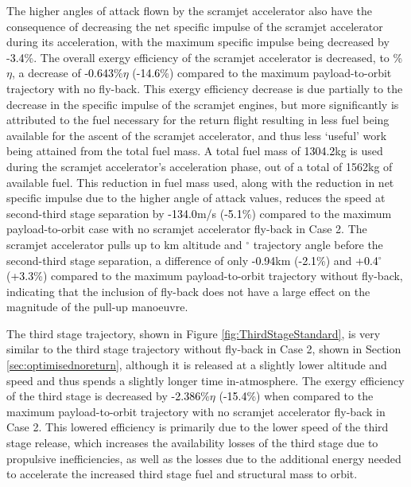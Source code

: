 The higher angles of attack flown by the scramjet accelerator also have the consequence of decreasing the net specific impulse of the scramjet accelerator during its acceleration, with the maximum specific impulse being decreased by -\textcolor{black}{3.4}\%.
The overall exergy efficiency of the scramjet accelerator is decreased, to \secondExergyEffStandard\%$\eta$, a decrease of \textcolor{black}{-0.643}\%$\eta$ (\textcolor{black}{-14.6}\%) compared to the maximum payload-to-orbit trajectory with no fly-back. This exergy efficiency decrease is due partially to the decrease in the specific impulse of the scramjet engines, but more significantly is attributed to the fuel necessary for the return flight resulting in less fuel being available for the ascent of the scramjet accelerator, and thus less `useful' work being attained from the total fuel mass.
A total fuel mass of \textcolor{black}{1304.2}kg is used during the scramjet accelerator's acceleration phase, out of a total of 1562kg of available fuel. This reduction in fuel mass used, along with the reduction in net specific impulse due to the higher angle of attack values, reduces the speed at second-third stage separation by \textcolor{black}{-134.0}m/s (\textcolor{black}{-5.1}\%) compared to the maximum payload-to-orbit case with no scramjet accelerator fly-back in Case 2. The scramjet accelerator pulls up to \secondthirdSeparationAltStandard km altitude and \secondthirdSeparationgammaStandard $^\circ$ trajectory angle before the second-third stage separation, a difference of only \textcolor{black}{-0.94}km (\textcolor{black}{-2.1}\%) and \textcolor{black}{+0.4}$^\circ$ (\textcolor{black}{+3.3}\%) compared to the maximum payload-to-orbit trajectory without fly-back, indicating that the inclusion of fly-back does not have a large effect on the magnitude of the pull-up manoeuvre. 

The third stage trajectory, shown in Figure \ref{fig:ThirdStageStandard}, is very similar to the third stage trajectory without fly-back in Case 2, shown in Section \ref{sec:optimisednoreturn}, although it is released at a slightly lower altitude and speed and thus spends a slightly longer time in-atmosphere. 
The exergy efficiency of the third stage is decreased by \textcolor{black}{-2.386}\%$\eta$ (\textcolor{black}{-15.4}\%) when compared to the maximum payload-to-orbit trajectory with no scramjet accelerator fly-back in Case 2. This lowered efficiency is primarily due to the lower speed of the third stage release, which increases the availability losses of the third stage due to propulsive inefficiencies, as well as the losses due to the additional energy needed to accelerate the increased third stage fuel and structural mass to orbit. 


